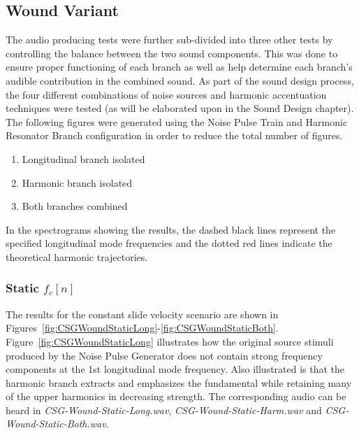 \documentclass[../main.tex]{subfiles}
\begin{document}
\subsection{Wound Variant}
The audio producing tests were further sub-divided into three other tests by controlling the balance between the two sound components. This was done to ensure proper functioning of each branch as well as help determine each branch's audible contribution in the combined sound. As part of the sound design process, the four different combinations of noise sources and harmonic accentuation techniques were tested (as will be elaborated upon in the Sound Design chapter). The following figures were generated using the Noise Pulse Train and Harmonic Resonator Branch configuration in order to reduce the total number of figures.

\begin{enumerate}
    \item Longitudinal branch isolated
    \item Harmonic branch isolated
    \item Both branches combined
\end{enumerate}

In the spectrograms showing the results, the dashed black lines represent the specified longitudinal mode frequencies and the dotted red lines indicate the theoretical harmonic trajectories.

\subsubsection{Static $f_c[n]$}
The results for the constant slide velocity scenario are shown in Figures~\ref{fig:CSGWoundStaticLong}-\ref{fig:CSGWoundStaticBoth}. Figure~\ref{fig:CSGWoundStaticLong} illustrates how the original source stimuli produced by the Noise Pulse Generator does not contain strong frequency components at the 1st longitudinal mode frequency. Also illustrated is that the harmonic branch extracts and emphasizes the fundamental while retaining many of the upper harmonics in decreasing strength. The corresponding audio can be heard in \emph{CSG-Wound-Static-Long.wav}, \emph{CSG-Wound-Static-Harm.wav} and \emph{CSG-Wound-Static-Both.wav}.
\end{document}
